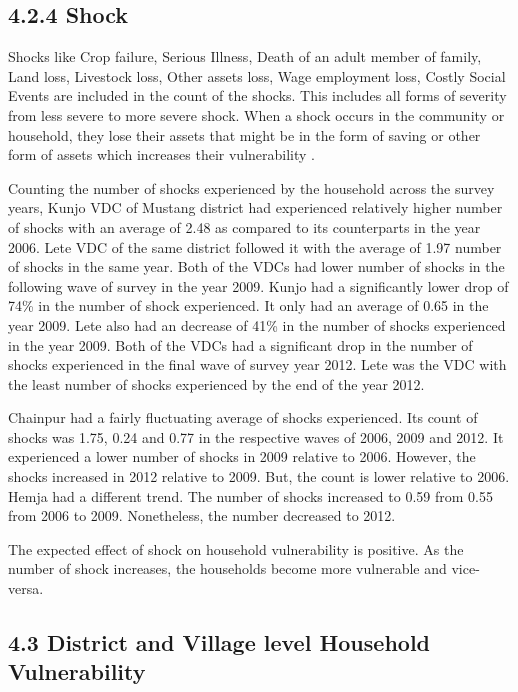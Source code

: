 \subsection*{4.2.4 Shock}
Shocks like Crop failure, Serious Illness, Death of an adult member of family, Land loss, Livestock loss, Other assets loss, Wage employment loss, Costly Social Events are included in the count of the shocks. This includes all forms of severity from less severe to more severe shock. When a shock occurs in the community or household, they lose their assets that might be in the form of saving or other form of assets which increases their vulnerability \citep{dercon2006vulnerability}. 

Counting the number of shocks experienced by the household across the survey years, Kunjo VDC of Mustang district had experienced relatively higher number of shocks with an average of 2.48 as compared to its counterparts in the year 2006. Lete VDC of the same district followed it with the average of 1.97 number of shocks in the same year. Both of the VDCs had lower number of shocks in the following wave of survey in the year 2009. Kunjo had a significantly lower drop of 74\% in the number of shock experienced. It only had an average of 0.65 in the year 2009. Lete also had an decrease of 41\% in the number of shocks experienced in the year 2009. Both of the VDCs had a significant drop in the number of shocks experienced in the final wave of survey year 2012. Lete was the VDC with the least number of shocks experienced by the end of the year 2012.

Chainpur  had a fairly fluctuating average of shocks experienced. Its count of shocks was 1.75, 0.24 and 0.77 in the respective waves of 2006, 2009 and 2012. It experienced a lower number of shocks in 2009 relative to 2006. However, the shocks increased in 2012 relative to 2009. But, the count is lower relative to 2006.
Hemja had a different trend. The number of shocks increased to 0.59 from 0.55 from 2006 to 2009. Nonetheless, the number decreased to 2012.

The expected effect of shock on household vulnerability is positive. As the number of shock increases, the households become more vulnerable and vice-versa.

\subsection*{4.3 District and Village level Household Vulnerability}
\renewcommand{\thepage}{\arabic{page}} 

